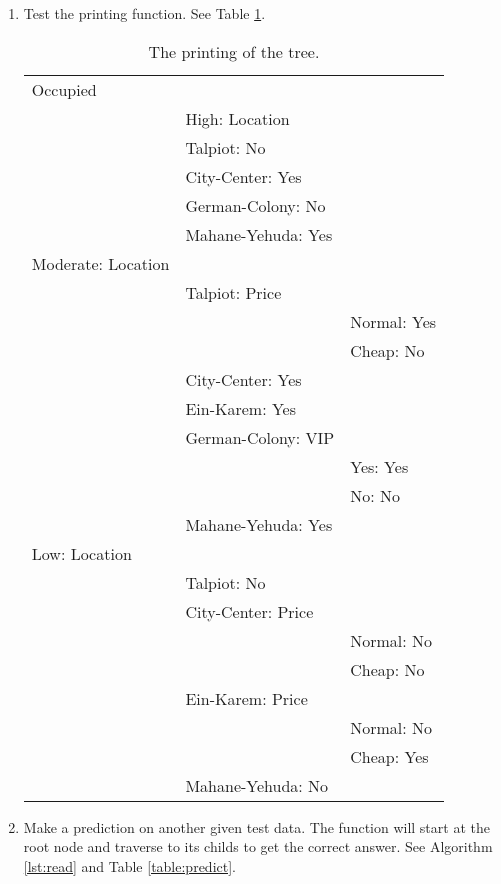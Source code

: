 \documentclass[12pt,letterpaper]{article}
\begin{document}
\begin{enumerate}
    \item Test the printing function.  See Table \ref{table:print}. 
    \begin{table}[!t]
        \caption{The printing of the tree.}
        \label{table:print}
        \begin{center}
        \begin{tabular}{l l l}
            \hline
            Occupied & \\
            &    High: Location\\
            &    Talpiot: No\\
            &    City-Center: Yes\\
            &    German-Colony: No\\
            &    Mahane-Yehuda: Yes\\
            Moderate: Location\\
            &    Talpiot: Price\\
            & &   Normal: Yes\\
            & &   Cheap: No\\
            &    City-Center: Yes\\
            &    Ein-Karem: Yes\\
            &    German-Colony: VIP\\
            & &   Yes: Yes\\
            & &   No: No\\
            &    Mahane-Yehuda: Yes\\
            Low: Location\\
            &    Talpiot: No\\
            &    City-Center: Price\\
            & &   Normal: No\\
            & &   Cheap: No\\
            &    Ein-Karem: Price\\
            & &   Normal: No\\
            & &   Cheap: Yes\\
            &    Mahane-Yehuda: No\\
            \hline
        \end{tabular}
        \end{center}
    \end{table}
    \newpage

    \item Make a prediction on another given test data.  The function will start at the root node and traverse to its childs to get the correct answer.  See Algorithm \ref{lst:read} and Table \ref{table:predict}.
    

\end{enumerate}
\end{document}
